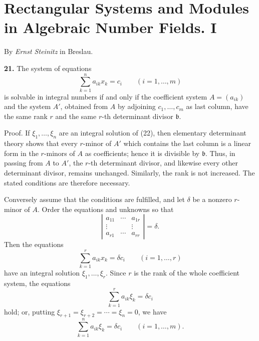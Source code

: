 \documentclass[11pt,a4paper]{article}
\begin{document}
\section*{Rectangular Systems and Modules in Algebraic Number Fields. I}
\begin{center}
By \emph{Ernst Steinitz} in Breslau.
\end{center}


\textbf{21.} The system of equations
\[
 \sum_{k=1}^{n} a_{ik}x_k=c_i\qquad(i=1,\ldots,m) \tag{22}
\]
is solvable in integral numbers if and only if the coefficient system \(A=(a_{ik})\) and the system \(A'\), obtained from \(A\) by adjoining \(c_1,\ldots,c_m\) as last column, have the same rank \(r\) and the same \(r\)-th determinant divisor \(\mathfrak b\).

Proof. If \(\xi_1,\ldots,\xi_n\) are an integral solution of (22), then elementary determinant theory shows that every \(r\)-minor of \(A'\) which contains the last column is a linear form in the \(r\)-minors of \(A\) as coefficients; hence it is divisible by \(\mathfrak b\). Thus, in passing from \(A\) to \(A'\), the \(r\)-th determinant divisor, and likewise every other determinant divisor, remains unchanged. Similarly, the rank is not increased. The stated conditions are therefore necessary.

Conversely assume that the conditions are fulfilled, and let \(\delta\) be a nonzero \(r\)-minor of \(A\). Order the equations and unknowns so that
\[
 \left|\begin{array}{ccc}
 a_{11}&\cdots&a_{1r}\\
 \vdots&&\vdots\\
 a_{r1}&\cdots&a_{rr}
 \end{array}\right|=\delta .
\]
Then the equations
\[
 \sum_{k=1}^{r}a_{ik}x_k=\delta c_i\qquad(i=1,\ldots,r)
\]
have an integral solution \(\xi_1,\ldots,\xi_r\). Since \(r\) is the rank of the whole coefficient system, the equations
\[
 \sum_{k=1}^{r}a_{ik}\xi_k=\delta c_i
\]
hold; or, putting \(\xi_{r+1}=\xi_{r+2}=\cdots=\xi_n=0\), we have
\[
 \sum_{k=1}^{n}a_{ik}\xi_k=\delta c_i\qquad(i=1,\ldots,m). \tag{23}
\]
\end{document}

